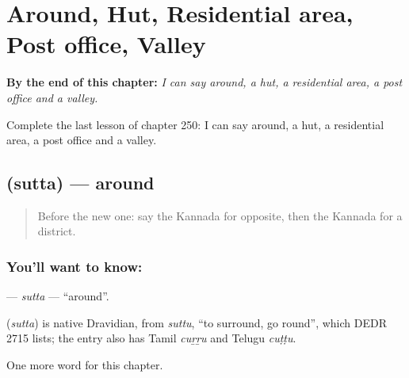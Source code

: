 
\chapter{Around, Hut, Residential area, Post office, Valley}
\label{ch:ka-around-hut-residential-area-post-office-valley}

\begin{chapteropening}
\textbf{By the end of this chapter:} \emph{I can say around, a hut, a residential area, a post office and a valley.}

Complete the last lesson of chapter 250: I can say around, a hut, a residential area, a post office and a valley.
\end{chapteropening}

\section[\texorpdfstring{\kn{ಸುತ್ತ} (sutta)}{ಸುತ್ತ (sutta)}]{ (sutta) — around}

\label{lesson:KA-C250-sutta}



\begin{quote}
Before the new one: say the Kannada for opposite, then the Kannada for a district.
\end{quote}

\subsection*{You'll want to know: }
\textbf{} — \emph{sutta} — \textquotedblleft{}around\textquotedblright{}.

\begin{cousinweb}
\textbf{} (\emph{sutta}) is native Dravidian, from \emph{suttu}, \textquotedblleft{}to surround, go round\textquotedblright{}, which DEDR 2715 lists; the entry also has Tamil \emph{cuṟṟu} and Telugu \emph{cuṭṭu}.
\end{cousinweb}

\begin{grammarlens}[title={What you've built}]
One more word for this chapter.
\end{grammarlens}


